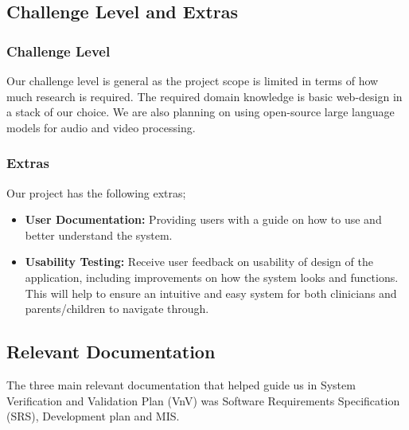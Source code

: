 \documentclass[12pt, titlepage]{article}
\begin{document}
\subsection{Challenge Level and Extras}

\subsubsection{Challenge Level} 

Our challenge level is general as the project scope is limited in terms of how much
research is required. The required domain knowledge is basic web-design in a
stack of our choice. We are also planning on using open-source large language
models for audio and video processing.

\subsubsection{Extras}
Our project has the following extras;
\begin{itemize}
  \item \textbf{User Documentation: } Providing users with a guide on how to use and
  better understand the system. 
  \item \textbf{Usability Testing: } Receive user feedback on usability of design of the application, 
including improvements on how the system looks and functions. This will help to ensure an 
intuitive and easy system for both clinicians and parents/children to navigate through.
\end{itemize}


\subsection{Relevant Documentation}


  The three main relevant documentation that helped guide us in System Verification and Validation Plan (VnV) was Software Requirements Specification
  (SRS), Development plan and MIS.  
  
\end{document}
